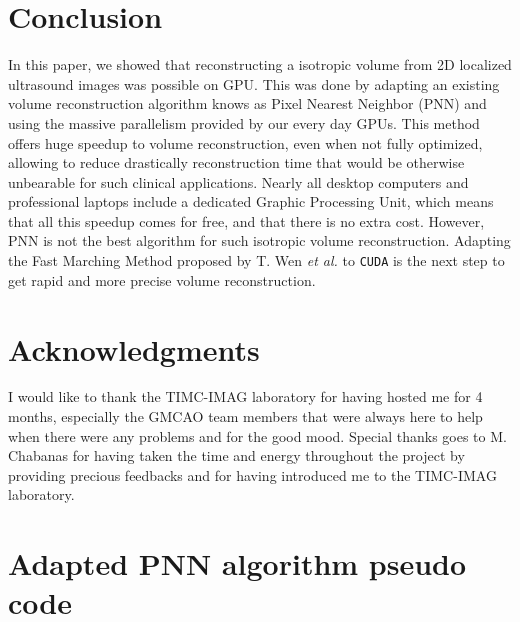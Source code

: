 \documentclass[12pt,journal,compsoc]{IEEEtran}
\begin{document}
\newpage
\section{Conclusion}
In this paper, we showed that reconstructing a isotropic volume from 2D localized ultrasound images was possible on GPU.
This was done by adapting an existing volume reconstruction algorithm knows as Pixel Nearest Neighbor (PNN) and using the massive parallelism provided by our every day GPUs.
This method offers huge speedup to volume reconstruction, even when not fully optimized, allowing to reduce drastically reconstruction time that would be otherwise unbearable for such clinical applications.
Nearly all desktop computers and professional laptops include a dedicated Graphic Processing Unit, which means that all this speedup comes for free, and that there is no extra cost.
However, PNN is not the best algorithm for such isotropic volume reconstruction. Adapting the Fast Marching Method proposed by T. Wen \textit{et al.} \textbf{\cite{2}} to \texttt{CUDA} is the next step to get rapid and more precise volume reconstruction.


\section*{Acknowledgments}
I would like to thank the TIMC-IMAG laboratory for having hosted me for 4 months, especially the GMCAO team members that were always here to help when there were any problems and for the good mood. Special thanks goes to M. Chabanas for having taken the time and energy throughout the project by providing precious feedbacks and for having introduced me to the TIMC-IMAG laboratory.




\appendices

\section{Adapted PNN algorithm pseudo code}
\end{document}
